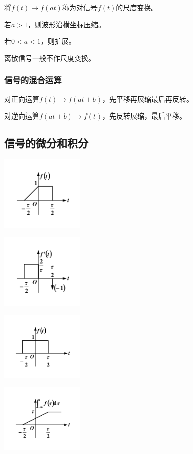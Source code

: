 \begin{BoxDefinition}[信号的展缩]
    将$f(t)\rightarrow f(at)$称为对信号$f(t)$的尺度变换。

    若$a>1$，则波形沿横坐标压缩。

    若$0<a<1$，则扩展。
\end{BoxDefinition}

离散信号一般不作尺度变换。

\subsubsection{信号的混合运算}

对正向运算$f(t)\rightarrow f(at+b)$，先平移再展缩最后再反转。

对逆向运算$f(at+b)\rightarrow f(t)$，先反转展缩，最后平移。

\subsection{信号的微分和积分}

\begin{Figure}[信号的微分]
    \begin{FigureSub}[微分前原始信号]
        \includegraphics[width=40mm]{visio/1.10-a.pdf}
    \end{FigureSub}
    \begin{FigureSub}[信号微分]
        \includegraphics[width=40mm]{visio/1.10-b.pdf}
    \end{FigureSub}
\end{Figure}

\begin{Figure}[信号的积分]
    \begin{FigureSub}[积分前原始信号]
        \includegraphics[width=40mm]{visio/1.11-a.pdf}
    \end{FigureSub}
    \begin{FigureSub}[信号积分]
        \includegraphics[width=40mm]{visio/1.11-b.pdf}
    \end{FigureSub}
\end{Figure}